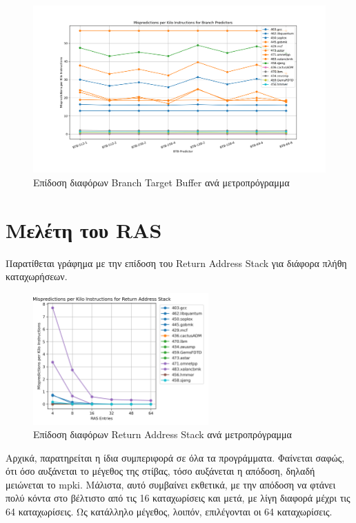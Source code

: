 \documentclass{article}
\newcommand{\eng}[1]{\foreignlanguage{english}{#1}}
\begin{document}
\begin{figure}[h]
    \centering
    \includegraphics[width=\textwidth]{./outputs/btb.png} 
    \caption{Επίδοση διαφόρων \eng{Branch Target Buffer} ανά μετροπρόγραμμα}
    \label{fig:btb}
\end{figure}
\FloatBarrier

\clearpage
\section{Μελέτη του \eng{RAS}}

Παρατίθεται γράφημα με την επίδοση του \eng{Return Address Stack} για διάφορα πλήθη καταχωρήσεων.

\begin{figure}[h]
    \centering
    \includegraphics[width=0.6\textwidth]{./outputs/ras.png} 
    \caption{Επίδοση διαφόρων \eng{Return Address Stack} ανά μετροπρόγραμμα}
    \label{fig:ras}
\end{figure}
\FloatBarrier

Αρχικά, παρατηρείται η ίδια συμπεριφορά σε όλα τα προγράμματα. Φαίνεται σαφώς, ότι όσο αυξάνεται το μέγεθος της στίβας, τόσο αυξάνεται η απόδοση, δηλαδή μειώνεται το \eng{mpki}. Μάλιστα, αυτό συμβαίνει εκθετικά, με την απόδοση να φτάνει πολύ κόντα στο βέλτιστο από τις 16 καταχωρίσεις και μετά, με λίγη διαφορά μέχρι τις 64 καταχωρίσεις. Ως κατάλληλο μέγεθος, λοιπόν, επιλέγονται οι 64 καταχωρίσεις. 
\end{document}
